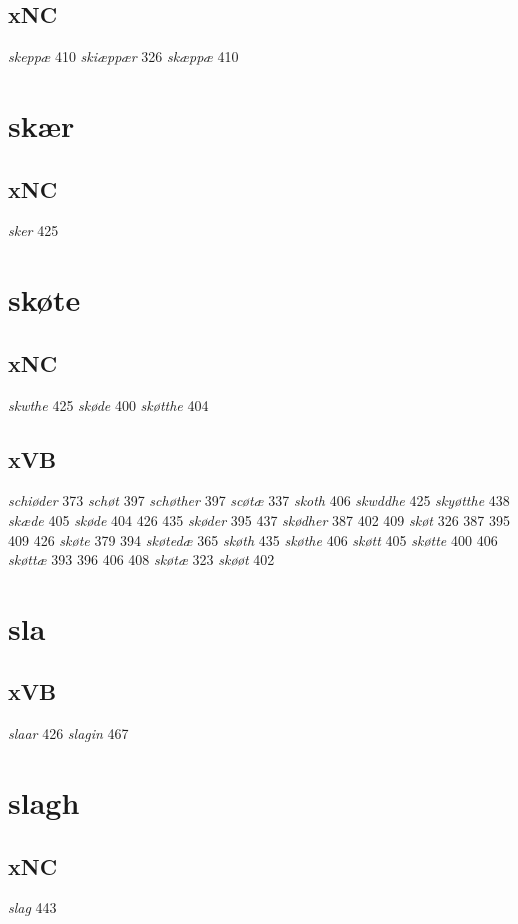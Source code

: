 \documentclass[a4paper,twocolumn]{article}
\begin{document}
\subsection{xNC}
\label{sec:org51c25ce}
\emph{skeppæ} 410 \emph{skiæppær} 326 \emph{skæppæ} 410 
\section{skær}
\label{sec:org007e12c}
\subsection{xNC}
\label{sec:org33994ea}
\emph{sker} 425 
\section{skøte}
\label{sec:org5d877f1}
\subsection{xNC}
\label{sec:org2dd9e49}
\emph{skwthe} 425 \emph{skøde} 400 \emph{skøtthe} 404 
\subsection{xVB}
\label{sec:org7a84b85}
\emph{schiøder} 373 \emph{schøt} 397 \emph{schøther} 397 \emph{scøtæ} 337 \emph{skoth} 406 \emph{skwddhe} 425 \emph{skyøtthe} 438 \emph{skæde} 405 \emph{skøde} 404 426 435 \emph{skøder} 395 437 \emph{skødher} 387 402 409 \emph{skøt} 326 387 395 409 426 \emph{skøte} 379 394 \emph{skøtedæ} 365 \emph{skøth} 435 \emph{skøthe} 406 \emph{skøtt} 405 \emph{skøtte} 400 406 \emph{skøttæ} 393 396 406 408 \emph{skøtæ} 323 \emph{skøøt} 402 
\section{sla}
\label{sec:org20a2ab0}
\subsection{xVB}
\label{sec:org94b166a}
\emph{slaar} 426 \emph{slagin} 467 
\section{slagh}
\label{sec:org64a3805}
\subsection{xNC}
\label{sec:org7d8d186}
\emph{slag} 443 
\end{document}

